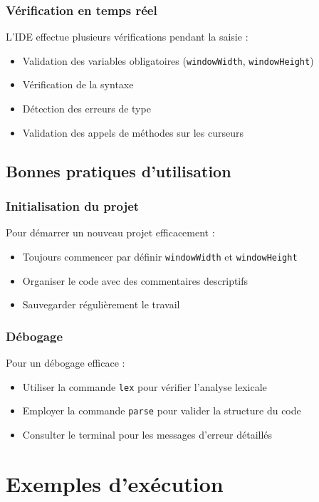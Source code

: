 \documentclass[12pt,a4paper]{report}
\begin{document}
\subsection{Vérification en temps réel}
L'IDE effectue plusieurs vérifications pendant la saisie :
\begin{itemize}
    \item Validation des variables obligatoires (\texttt{windowWidth}, \texttt{windowHeight})
    \item Vérification de la syntaxe
    \item Détection des erreurs de type
    \item Validation des appels de méthodes sur les curseurs
\end{itemize}

\section{Bonnes pratiques d'utilisation}

\subsection{Initialisation du projet}
Pour démarrer un nouveau projet efficacement :
\begin{itemize}
    \item Toujours commencer par définir \texttt{windowWidth} et \texttt{windowHeight}
    \item Organiser le code avec des commentaires descriptifs
    \item Sauvegarder régulièrement le travail
\end{itemize}

\subsection{Débogage}
Pour un débogage efficace :
\begin{itemize}
    \item Utiliser la commande \texttt{lex} pour vérifier l'analyse lexicale
    \item Employer la commande \texttt{parse} pour valider la structure du code
    \item Consulter le terminal pour les messages d'erreur détaillés
\end{itemize}


\chapter{Exemples d'exécution}
\end{document}
